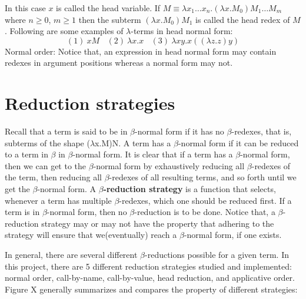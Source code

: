 \documentclass[a4paper,11pt,twoside]{report}
\begin{document}
In this case $x$ is called the head variable. If $M \equiv \lambda x_1\ldots x_n.(\lambda x.M_0)M_1\ldots M_m$ where $n\geqslant 0$, $m\geqslant 1$ then the subterm $(\lambda x.M_0)M_1$ is called the head redex of $M$. Following are some examples of $\lambda$-terms in head normal form:
\begin{equation*}
(1)\ xM\ \ \ \ (2)\ \lambda x.x\ \ \ \ (3)\ \lambda xy.x((\lambda z.z)y)
\end{equation*}Normal order:
Notice that, an expression in head normal form may contain redexes in argument positions whereas a normal form may not.


\section{Reduction strategies}\label{sec:reductionstrategy}
\noindent Recall that a term is said to be in $\beta$-normal form if it has no $\beta$-redexes, that is, subterms of the shape ($\lambda$x.M)N. A term has a $\beta$-normal form if it can be reduced to a term in $\beta$ in $\beta$-normal form. It is clear that if a term has a $\beta$-normal form, then we can get to the $\beta$-normal form by exhaustively reducing all $\beta$-redexes of the term, then reducing all $\beta$-redexes of all resulting terms, and so forth until we get the $\beta$-normal form. A \textbf{$\beta$-reduction strategy} is a function that selects, whenever a term has multiple $\beta$-redexes, which one should be reduced first. If a term is in $\beta$-normal form, then no $\beta$-reduction is to be done. Notice that, a $\beta$-reduction strategy may or may not have the property that adhering to the strategy will ensure that we(eventually) reach a $\beta$-normal form, if one exists. 

In general, there are several different $\beta$-reductions possible for a given term. In this project, there are 5 different reduction strategies studied and implemented: normal order, call-by-name, call-by-value, head reduction, and applicative order. Figure X generally summarizes and compares the property of different strategies:
 
\end{document}
